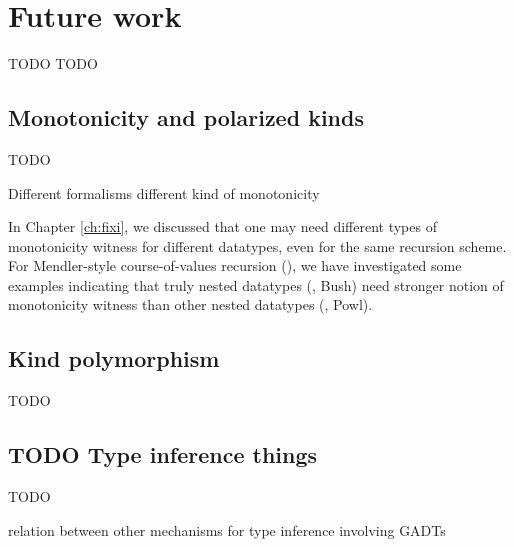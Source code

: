 \chapter{Future work}\label{ch:futwork} TODO
TODO





\section{Monotonicity and polarized kinds}
TODO



Different formalisms different kind of monotonicity

In Chapter \ref{ch:fixi}, we discussed that one may need
different types of monotonicity witness for different datatypes,
even for the same recursion scheme.
For Mendler-style course-of-values recursion (\McvPr),
we have investigated some examples indicating that
truly nested datatypes (\eg, Bush) need stronger notion of
monotonicity witness than other nested datatypes (\eg, Powl).


\section{Kind polymorphism}\label{sec:futwork:kindpoly}
TODO

\section{TODO Type inference things}
TODO

relation between other mechanisms for type inference involving GADTs

